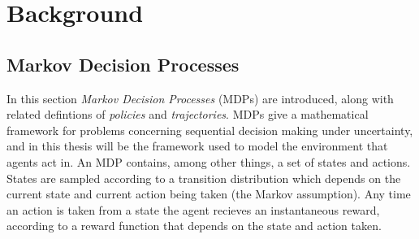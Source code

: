 

\chapter{\label{ch:2-background}Background}

    \minitoc









    


\section{Markov Decision Processes}
\label{sec:2-1-mdps}


    In this section \textit{Markov Decision Processes} (MDPs) are introduced, along with related defintions of \textit{policies} and \textit{trajectories}. MDPs give a mathematical framework for problems concerning sequential decision making under uncertainty, and in this thesis will be the framework used to model the environment that agents act in. An MDP contains, among other things, a set of states and actions. States are sampled according to a transition distribution which depends on the current state and current action being taken (the Markov assumption). Any time an action is taken from a state the agent recieves an instantaneous reward, according to a reward function that depends on the state and action taken.

